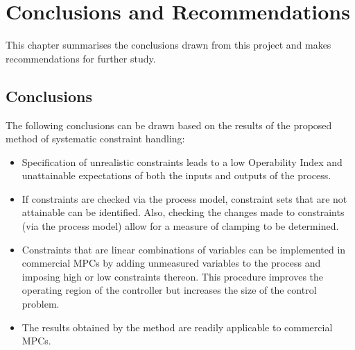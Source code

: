 \chapter{Conclusions and Recommendations}\label{chap:conclusion}
\begin{overview}
  This chapter summarises the conclusions drawn from this project and makes recommendations for further study.
\end{overview}

\section{Conclusions}
The following conclusions can be drawn based on the results of the proposed method of systematic constraint handling:
\begin{itemize}
  \item Specification of unrealistic constraints leads to a low Operability Index and unattainable expectations of both the inputs and outputs of the process.
  \item If constraints are checked via the process model, constraint sets that are not attainable can be identified. Also, checking the changes made to constraints (via the process model) allow for a measure of clamping to be determined.
  \item Constraints that are linear combinations of variables can be implemented in commercial MPCs by adding unmeasured variables to the process and imposing high or low constraints thereon.
This procedure improves the operating region of the controller but increases the size of the control problem.
  \item The results obtained by the method are readily applicable to commercial MPCs.
\end{itemize}

